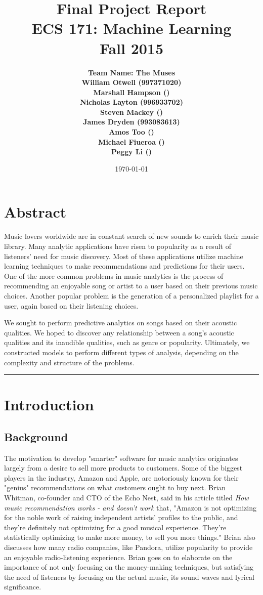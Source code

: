 \documentclass[12pt]{article}
\title{\vspace{-3ex}\bf Final Project Report\\[2ex] 
       \normalsize ECS 171: Machine Learning\\Fall 2015}
\date{\today}
\author{\bf Team Name: The Muses\\ \bf William Otwell (997371020)\\ \bf Marshall Hampson ()\\ \bf Nicholas Layton (996933702)\\ \bf Steven Mackey ()\\ \bf James Dryden (993083613)\\ \bf Amos Too ()\\ \bf Michael Fiueroa ()\\ \bf Peggy Li ()}
\newcommand{\horizontalLine}{
	\begin{center}
		\hrule width 1.0\textwidth
	\end{center}
}
\begin{document}
\maketitle
\pagebreak
\tableofcontents
\pagebreak

\section{Abstract}
\label{sec:abstract}
Music lovers worldwide are in constant search of new sounds to enrich their music library. Many analytic applications have risen to popularity as a result of listeners' need for music discovery. Most of these applications utilize machine learning techniques to make recommendations and predictions for their users. One of the more common problems in music analytics is the process of recommending an enjoyable song or artist to a user based on their previous music choices. Another popular problem is the generation of a personalized playlist for a user, again based on their listening choices. 

We sought to perform predictive analytics on songs based on their acoustic qualities. We hoped to discover any relationship between a song's acoustic qualities and its inaudible qualities, such as genre or popularity. Ultimately, we constructed models to perform different types of analysis, depending on the complexity and structure of the problems. 

\horizontalLine
\section{Introduction}
\label{sec:introduction}

\subsection{Background}
\label{subsec:background}
The motivation to develop "smarter" software for music analytics originates largely from a desire to sell more products to customers. Some of the biggest players in the industry, Amazon and Apple, are notoriously known for their "genius" recommendations on what customers ought to buy next. Brian Whitman, co-founder and CTO of the Echo Nest, said in his article titled \textit{How music recommendation works - and doesn't work} that, "Amazon is not optimizing for the noble work of raising independent artists' profiles to the public, and they're definitely not optimizing for a good musical experience. They're statistically optimizing to make more money, to sell you more things." Brian also discusses how many radio companies, like Pandora, utilize popularity to provide an enjoyable radio-listening experience. Brian goes on to elaborate on the importance of not only focusing on the money-making techniques, but satisfying the need of listeners by focusing on the actual music, its sound waves and lyrical significance. 
\end{document}
